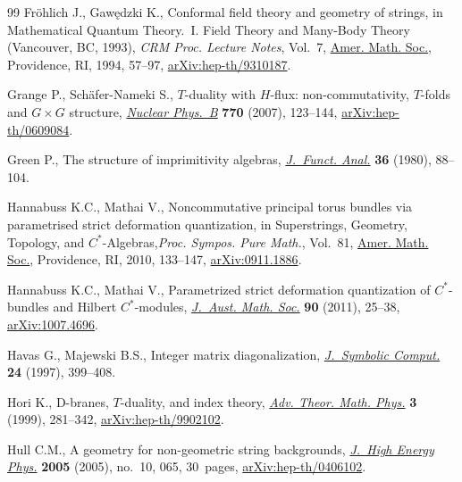 \begin{thebibliography}{99}
Fr\"ohlich J., Gaw\k{e}dzki K., Conformal field theory and geometry of strings,
 in Mathematical Quantum Theory.~{I}. {F}ield Theory and Many-Body Theory
 ({V}ancouver, {BC}, 1993), \textit{CRM Proc. Lecture Notes}, Vol.~7, \href{https://doi.org/10.1090/crmp/007/03}{Amer.
 Math. Soc.}, Providence, RI, 1994, 57--97, \href{https://arxiv.org/abs/hep-th/9310187}{arXiv:hep-th/9310187}.

Grange P., Sch\"afer-Nameki S., {$T$}-duality with {$H$}-flux:
 non-commutativity, {$T$}-folds and {$G\times G$} structure, \href{https://doi.org/10.1016/j.nuclphysb.2007.02.003}{\textit{Nuclear
 Phys.~B}} \textbf{770} (2007), 123--144, \href{https://arxiv.org/abs/hep-th/0609084}{arXiv:hep-th/0609084}.

Green P., The structure of imprimitivity algebras, \href{https://doi.org/10.1016/0022-1236(80)90108-1}{\textit{J.~Funct. Anal.}}
 \textbf{36} (1980), 88--104.

Hannabuss K.C., Mathai V., Noncommutative principal torus bundles via
 parametrised strict deformation quantization, in Superstrings, Geometry,
 Topology, and {$C^\ast$}-Algebras,\textit{Proc. Sympos. Pure Math.},
 Vol.~81, \href{https://doi.org/10.1090/pspum/081/2681761}{Amer. Math. Soc.}, Providence, RI, 2010, 133--147,
 \href{https://arxiv.org/abs/0911.1886}{arXiv:0911.1886}.

Hannabuss K.C., Mathai V., Parametrized strict deformation quantization of
 {$C^\ast$}-bundles and {H}ilbert {$C^\ast$}-modules, \href{https://doi.org/10.1017/S1446788711001170}{\textit{J.~Aust. Math.
 Soc.}} \textbf{90} (2011), 25--38, \href{https://arxiv.org/abs/#2}{arXiv:1007.4696}.

Havas G., Majewski B.S., Integer matrix diagonalization, \href{https://doi.org/10.1006/jsco.1996.0141}{\textit{J.~Symbolic
 Comput.}} \textbf{24} (1997), 399--408.

Hori K., D-branes, {$T$}-duality, and index theory, \href{https://doi.org/10.4310/ATMP.1999.v3.n2.a5}{\textit{Adv. Theor. Math.
 Phys.}} \textbf{3} (1999), 281--342, \href{https://arxiv.org/abs/hep-th/9902102}{arXiv:hep-th/9902102}.

Hull C.M., A geometry for non-geometric string backgrounds, \href{https://doi.org/10.1088/1126-6708/2005/10/065}{\textit{J.~High
 Energy Phys.}} \textbf{2005} (2005), no.~10, 065, 30~pages,
 \href{https://arxiv.org/abs/hep-th/0406102}{arXiv:hep-th/0406102}.


\end{thebibliography}
